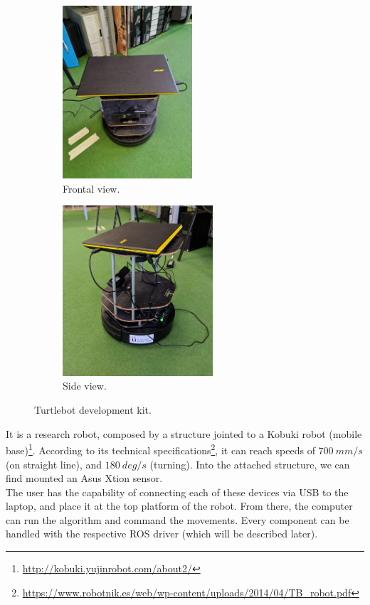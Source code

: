 		\begin{figure}[h]
			\centering
			\begin{subfigure}[h]{0.4\linewidth}
				\includegraphics[width=1.9in]{images/real_turtlebot_1}
				\caption{Frontal view.}
				\label{fig:3_turtlebot_front}
			\end{subfigure}
			\begin{subfigure}[h]{0.4\linewidth}
				\includegraphics[width=2.2in]{images/real_turtlebot_2}
				\caption{Side view.}
				\label{fig:3_turtlebot_side}
			\end{subfigure}
			\caption{Turtlebot development kit.}
			\label{fig:3_turtlebot}
		\end{figure}
		
		It is a research robot, composed by a structure jointed to a Kobuki robot (mobile base)\footnote{\url{http://kobuki.yujinrobot.com/about2/}}. According to its technical specifications\footnote{\url{https://www.robotnik.es/web/wp-content/uploads/2014/04/TB_robot.pdf}}, it can reach speeds of $700 \ mm/s$ (on straight line), and $180\ deg/s$ (turning). Into the attached structure, we can find mounted an Asus Xtion sensor.\\
	
		The user has the capability of connecting each of these devices via USB to the laptop, and place it at the top platform of the robot. From there, the computer can run the algorithm and command the movements. Every component can be handled with the respective ROS driver (which will be described later).
		
